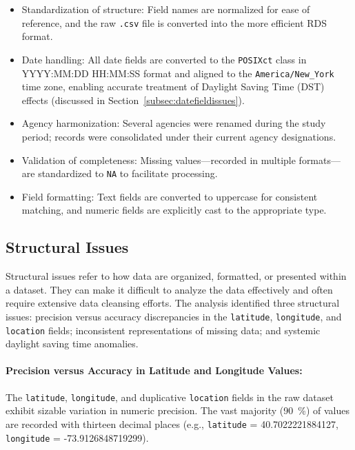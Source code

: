 \documentclass[linenumber]{jdsart}
\begin{document}
\begin{itemize}[left=1.5em, itemsep=0.25\baselineskip]
  \item Standardization of structure: Field names are normalized for ease of reference, and the raw
  \texttt{.csv} file is converted into the more efficient RDS format.

  \item Date handling: All date fields are converted to the \texttt{POSIXct} class in 
  YYYY:MM:DD HH:MM:SS format and aligned to the \texttt{America/New\_York} 
  time zone, enabling accurate treatment of Daylight Saving Time (DST) 
  effects (discussed in Section~\ref{subsec:datefieldissues}).

  \item Agency harmonization: Several agencies were renamed during the study period; records were
  consolidated under their current agency designations.

  \item Validation of completeness: Missing values—recorded in multiple 
  formats—are standardized to \texttt{NA} to facilitate processing. 

  \item Field formatting: Text fields are converted to uppercase for 
  consistent matching, and numeric fields are explicitly cast to the appropriate type.
\end{itemize}


\subsection{Structural Issues}
\label{sec:structural}
Structural issues refer to how data are organized, formatted, 
or presented within a dataset. They can make 
it difficult to analyze the data effectively and often require extensive 
data cleansing efforts. The analysis identified three structural issues:
precision versus accuracy discrepancies in the
\texttt{latitude}, \texttt{longitude}, and \texttt{location}
fields; inconsistent representations of missing data; and
systemic daylight saving time anomalies.


\paragraph{Precision versus Accuracy in Latitude and Longitude Values:}
\label{par:precision}
The \texttt{latitude}, \texttt{longitude}, and duplicative
\texttt{location} fields in the raw dataset exhibit sizable
variation in numeric precision. The vast majority
(\SI{90}{\percent}) of values are recorded with thirteen
decimal places (e.g., \texttt{latitude} = 40.7022221884127,
\texttt{longitude} = -73.9126848719299).
\end{document}
